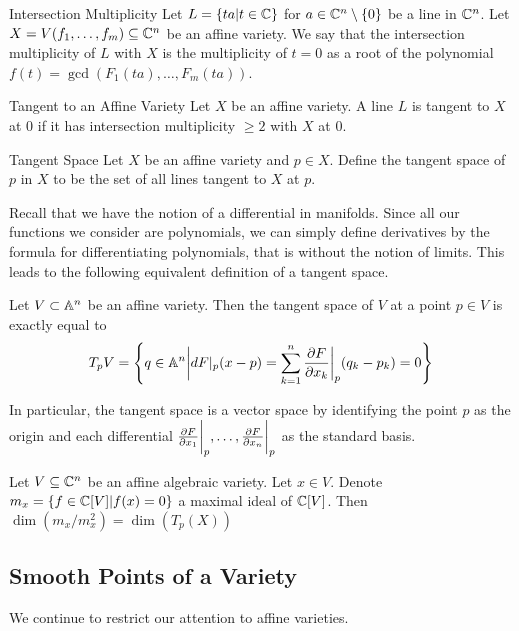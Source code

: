 \documentclass[a4paper]{article}
\begin{document}
\begin{defn}{Intersection Multiplicity}{} Let $L=\{ta|t\in\mathbb{C}\}$ for $a\in\mathbb{C}^n\setminus\{0\}$ be a line in $\mathbb{C}^n$. Let $X=V(f_1,\dots,f_m)\subseteq\mathbb{C}^n$ be an affine variety. We say that the intersection multiplicity of $L$ with $X$ is the multiplicity of $t=0$ as a root of the polynomial $f(t)=\gcd(F_1(ta),\dots,F_m(ta))$. 
\end{defn}

\begin{defn}{Tangent to an Affine Variety}{} Let $X$ be an affine variety. A line $L$ is tangent to $X$ at $0$ if it has intersection multiplicity $\geq 2$ with $X$ at $0$. 
\end{defn}

\begin{defn}{Tangent Space}{} Let $X$ be an affine variety and $p\in X$. Define the tangent space of $p$ in $X$ to be the set of all lines tangent to $X$ at $p$. 
\end{defn}

Recall that we have the notion of a differential in manifolds. Since all our functions we consider are polynomials, we can simply define derivatives by the formula for differentiating polynomials, that is without the notion of limits. This leads to the following equivalent definition of a tangent space. 

\begin{prp}{}{} Let $V\subset\mathbb{A}^n$ be an affine variety. Then the tangent space of $V$ at a point $p\in V$ is exactly equal to $$T_pV=\left\{q\in\mathbb{A}^n\bigg{|}dF|_p(x-p)=\sum_{k=1}^n\frac{\partial F}{\partial x_k}\bigg{|}_p(q_k-p_k)=0\right\}$$
\end{prp}

In particular, the tangent space is a vector space by identifying the point $p$ as the origin and each differential $\frac{\partial F}{\partial x_1}\bigg{|}_p,\dots,\frac{\partial F}{\partial x_n}\bigg{|}_p$ as the standard basis. 

\begin{prp}{}{} Let $V\subseteq\mathbb{C}^n$ be an affine algebraic variety. Let $x\in V$. Denote $m_x=\{f\in\mathbb{C}[V]|f(x)=0\}$ a maximal ideal of $\mathbb{C}[V]$. Then $\dim(m_x/m_x^2)=\dim(T_p(X))$
\end{prp}

\subsection{Smooth Points of a Variety}
We continue to restrict our attention to affine varieties. 
\end{document}
